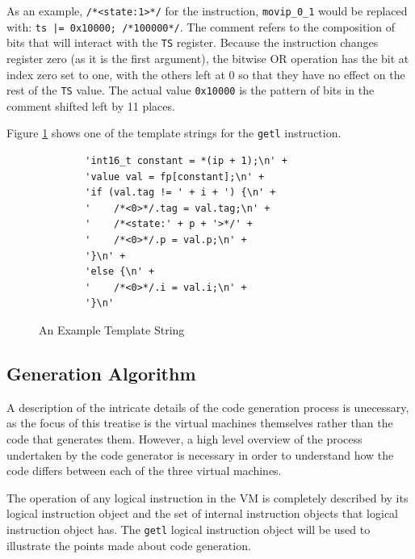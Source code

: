 \documentclass[english,a4paper,12pt]{report}
\begin{document}
As an example, \verb|/*<state:1>*/| for the instruction,
\verb|movip_0_1| would be replaced with:
\verb+ts |= 0x10000; /*100000*/+. The comment refers to the
composition of bits that will interact with the \verb|TS|
register. Because the instruction changes register zero (as it is the
first argument), the bitwise OR operation has the bit at index zero set
to one, with the others left at 0 so that they have no effect on the
rest of the \verb|TS| value. The actual value \verb|0x10000| is the
pattern of bits in the comment shifted left by 11 places.

Figure \ref{fig:template-string} shows one of the template strings
for the \verb|getl| instruction.

\begin{figure}
	\begin{lstlisting}
		'int16_t constant = *(ip + 1);\n' +
		'value val = fp[constant];\n' +
		'if (val.tag != ' + i + ') {\n' +
		'    /*<0>*/.tag = val.tag;\n' +
		'    /*<state:' + p + '>*/' +
		'    /*<0>*/.p = val.p;\n' +
		'}\n' +
		'else {\n' +
		'    /*<0>*/.i = val.i;\n' +
		'}\n'
	\end{lstlisting}
	\caption{An Example Template String}
	\label{fig:template-string}
\end{figure}


\subsection{Generation Algorithm}
\label{sec:generation-algorithm}
A description of the intricate details of the code generation process
is unecessary, as the focus of this treatise is the virtual machines
themselves rather than the code that generates them. However, a high
level overview of the process undertaken by the code generator is
necessary in order to understand how the code differs between each of
the three virtual machines.

The operation of any logical instruction in the VM is completely
described by its logical instruction object and the set of internal
instruction objects that logical instruction object has. The
\verb|getl| logical instruction object will be used to illustrate the
points made about code generation.
\end{document}
